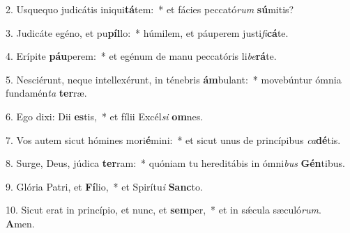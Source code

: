 2. Usquequo judicátis iniqui\textbf{tá}tem:~*  et fácies peccató\textit{rum} \textbf{sú}mitis?\

3. Judicáte egéno, et pu\textbf{píl}lo:~*  húmilem, et páuperem justi\textit{fi}\textbf{cá}te.\

4. Erípite \textbf{páu}perem:~*  et egénum de manu peccatóris li\textit{be}\textbf{rá}te.\

5. Nesciérunt, neque intellexérunt, in ténebris \textbf{ám}bulant:~*  movebúntur ómnia fundamén\textit{ta} \textbf{ter}ræ.\

6. Ego dixi: Dii \textbf{es}tis,~*  et fílii Excél\textit{si} \textbf{om}nes.\

7. Vos autem sicut hómines mori\textbf{é}mini:~*  et sicut unus de princípibus \textit{ca}\textbf{dé}tis.\

8. Surge, Deus, júdica \textbf{ter}ram:~*  quóniam tu hereditábis in ómni\textit{bus} \textbf{Gén}tibus.\

9. Glória Patri, et \textbf{Fí}lio,~*  et Spirítu\textit{i} \textbf{Sanc}to.\

10. Sicut erat in princípio, et nunc, et \textbf{sem}per,~*  et in sǽcula sæculó\textit{rum}. \textbf{A}men.\

